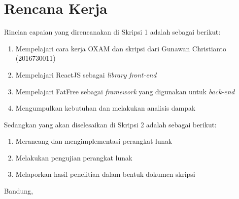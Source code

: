 \documentclass[a4paper,twoside]{article}
\begin{document}
\section{Rencana Kerja}
Rincian capaian yang direncanakan di Skripsi 1 adalah sebagai berikut:
\begin{enumerate}
\item Mempelajari cara kerja OXAM dan skripsi dari Gunawan Christianto (2016730011)
\item Mempelajari ReactJS sebagai \textit{library front-end}
\item Mempelajari FatFree  sebagai \textit{framework} yang digunakan untuk \textit{back-end}
\item Mengumpulkan kebutuhan dan melakukan analisis dampak
\end{enumerate}

Sedangkan yang akan diselesaikan di Skripsi 2 adalah sebagai berikut:
\begin{enumerate}

\item Merancang dan mengimplementasi perangkat lunak
\item Melakukan pengujian perangkat lunak
\item Melaporkan hasil penelitian dalam bentuk dokumen skripsi
\end{enumerate}

\vspace{1cm}
\centering Bandung, \tanggal\\

 \vspace{2cm}\nama \\ 
\vspace{1cm}
\end{document}
